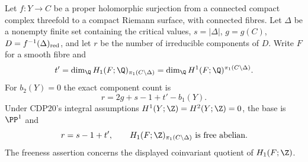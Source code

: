 \begin{proposition}\hypertarget{tag-01G0}{}\label{cdp:st:D.1.2}

Let $f:Y\to C$ be a proper holomorphic surjection from a connected
compact complex threefold to a compact Riemann surface, with
connected fibres. Let $\Delta$ be a nonempty finite set containing
the critical values, $s=|\Delta|$, $g=g(C)$,
$D=f^{-1}(\Delta)_{\rm red}$, and let $r$ be the number of
irreducible components of $D$. Write $F$ for a smooth fibre and
\[
t'=\dim_{\Q}H_1(F;\Q)_{\pi_1(C\setminus\Delta)}
   =\dim_{\Q}H^1(F;\Q)^{\pi_1(C\setminus\Delta)}.
\]
For $b_2(Y)=0$ the exact component count is
\[
\boxed{\quad r=2g+s-1+t'-b_1(Y).\quad}
\]
Under CDP20's integral assumptions
$H^1(Y;\Z)=H^2(Y;\Z)=0$, the base is $\PP^1$ and
\[
r=s-1+t',\qquad
H_1(F;\Z)_{\pi_1(C\setminus\Delta)}\text{ is free abelian}.
\]
The freeness assertion concerns the displayed coinvariant quotient of
$H_1(F;\Z)$.
\end{proposition}






